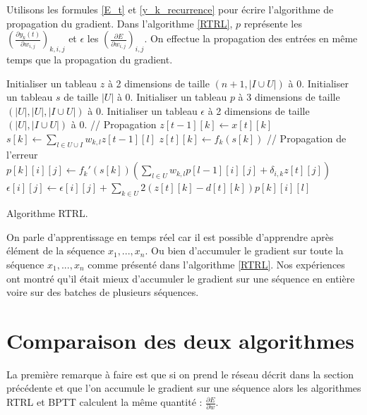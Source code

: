 Utilisons les formules \ref{E_t} et \ref{y_k_recurrence} pour écrire l'algorithme de propagation du gradient. Dans l'algorithme \ref{RTRL}, $p$ représente les $(\frac{\partial y_k(t)}{\partial w_{i,j}})_{k,i,j}$ et $\epsilon$ les $(\frac{\partial E}{\partial w_{i,j}})_{i,j}$. On effectue la propagation des entrées en même temps que la propagation du gradient.

\begin{algorithm} 
\begin{algorithmic}
\State Initialiser un tableau $z$ à 2 dimensions de taille $(n+1, |I \cup U|)$ à $0$.
\State Initialiser un tableau $s$ de taille $|U|$ à $0$.
\State Initialiser un tableau $p$ à 3 dimensions de taille $(|U|, |U|, |I \cup U|)$ à $0$.
\State Initialiser un tableau $\epsilon$ à 2 dimensions de taille $(|U|, |I \cup U|)$ à $0$.
	\State // Propagation
		\State $z[t-1][k] \leftarrow x[t][k]$
	\EndFor
		\State $s[k] \leftarrow \sum_{l \in U \cup I}{w_{k,l}z[t-1][l]}$
		\State $z[t][k] \leftarrow f_k(s[k])$
	\EndFor
	\State // Propagation de l'erreur
				\State $p[k][i][j] \leftarrow f_k'(s[k])\left(\sum_{l \in U}{w_{k,l}p[l-1][i][j]+\delta_{i,k}z[t][j]}\right)$
			\EndFor
		\EndFor
	\EndFor
			\State $\epsilon[i][j] \leftarrow \epsilon[i][j] + \sum_{k \in U}{2(z[t][k]-d[t][k])p[k][i][l]}$
		\EndFor
	\EndFor
\EndFor
\EndProcedure
\end{algorithmic} 
\caption{Algorithme RTRL.}
\label{RTRL}
\end{algorithm}

On parle d'apprentissage en temps réel car il est possible d'apprendre après élément de la séquence $x_1, ..., x_n$. Ou bien d'accumuler le gradient sur toute la séquence $x_1, ..., x_n$ comme présenté dans l'algorithme \ref{RTRL}. Nos expériences ont montré qu'il était mieux d'accumuler le gradient sur une séquence en entière voire sur des batches de plusieurs séquences.

\section{Comparaison des deux algorithmes}

La première remarque à faire est que si on prend le réseau décrit dans la section précédente et que l'on accumule le gradient sur une séquence alors les algorithmes RTRL et BPTT calculent la même quantité : $\frac{\partial E}{\partial w}$.

